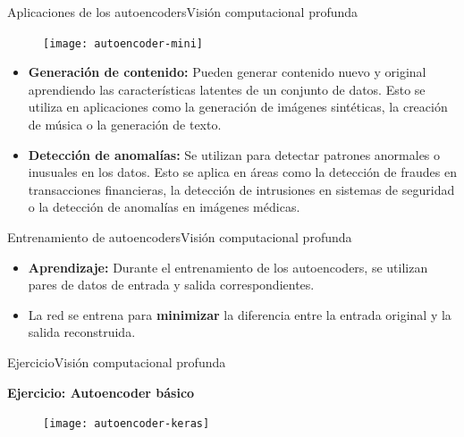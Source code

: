 \documentclass[10pt,border=3pt,tikz]{beamer}
\begin{document}
    \begin{frame}{Aplicaciones de los autoencoders}{Visión computacional profunda}
        \begin{figure}
            \centering
            \texttt{[image: autoencoder-mini]}
        \end{figure}
        \begin{itemize}
            \item \textbf{Generación de contenido:} Pueden generar contenido nuevo y original aprendiendo las características latentes de un conjunto de datos. Esto se utiliza en aplicaciones como la generación de imágenes sintéticas, la creación de música o la generación de texto.
            \item \textbf{Detección de anomalías:} Se utilizan para detectar patrones anormales o inusuales en los datos. Esto se aplica en áreas como la detección de fraudes en transacciones financieras, la detección de intrusiones en sistemas de seguridad o la detección de anomalías en imágenes médicas.
        \end{itemize}
    \end{frame}
    
    \begin{frame}{Entrenamiento de autoencoders}{Visión computacional profunda}
        \begin{itemize}
            \item \textbf{Aprendizaje:} Durante el entrenamiento de los autoencoders, se utilizan pares de datos de entrada y salida correspondientes. 
            \item La red se entrena para \textbf{minimizar} la diferencia entre la entrada original y la salida reconstruida.
        \end{itemize}
    \end{frame}
    
    \begin{frame}{Ejercicio}{Visión computacional profunda}
        \begin{center}
            {\Large \textbf{Ejercicio: Autoencoder básico}}
        \end{center}
        \begin{figure}
            \centering
            \texttt{[image: autoencoder-keras]}
        \end{figure}
    \end{frame}
    
\end{document}
